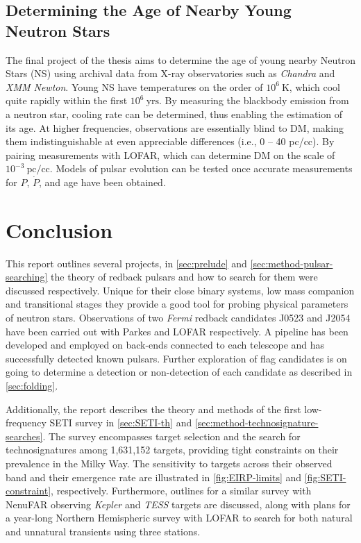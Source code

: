 \subsection{Determining the Age of Nearby Young Neutron Stars}
The final project of the thesis aims to determine the age of young nearby Neutron Stars (NS) using archival data from X-ray observatories such as \textit{Chandra} and \textit{XMM Newton}. Young NS have temperatures on the order of $10^6~\text{K}$, which cool quite rapidly within the first $10^{6}~\text{yrs}$. By measuring the blackbody emission from a neutron star,  cooling rate can be determined, thus enabling the estimation of its age. At higher frequencies, observations are essentially blind to DM, making them indistinguishable at even appreciable differences (i.e., 0 -- 40 pc/cc). By pairing measurements with LOFAR, which can determine DM on the scale of $10^{-3}~\text{pc/cc}$. Models of pulsar evolution can be tested once accurate measurements for $P$, $\dot P$, and age have been obtained. 

\newpage
\section{Conclusion}

This report outlines several projects, in \cref{sec:prelude} and \cref{sec:method-pulsar-searching} the theory of redback pulsars and how to search for them were discussed respectively. Unique for their close binary systems, low mass companion and transitional stages they provide a good tool for probing physical parameters of neutron stars. Observations of two \textit{Fermi} redback candidates J0523 and J2054 have been carried out with Parkes and LOFAR respectively. A pipeline has been developed and employed on back-ends connected to each telescope and has successfully detected known pulsars. Further exploration of flag candidates is on going to determine a detection or non-detection of each candidate as described in \cref{sec:folding}. \ 

Additionally, the report describes the theory and methods of the first low-frequency SETI survey in \cref{sec:SETI-th} and \cref{sec:method-technosignature-searches}. The survey encompasses target selection and the search for technosignatures among 1,631,152 targets, providing tight constraints on their prevalence in the Milky Way. The sensitivity to targets across their observed band and their emergence rate are illustrated in \cref{fig:EIRP-limits} and \cref{fig:SETI-constraint}, respectively. Furthermore, outlines for a similar survey with NenuFAR observing \textit{Kepler} and \textit{TESS} targets are discussed, along with plans for a year-long Northern Hemispheric survey with LOFAR to search for both natural and unnatural transients using three stations.

